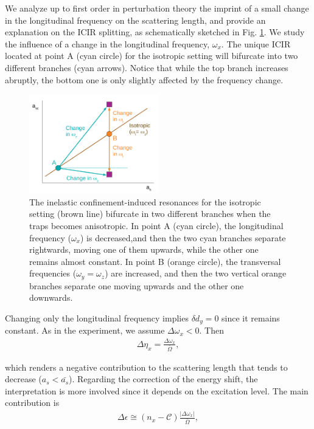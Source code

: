 \documentclass[aps,pre,twocolumn,superscriptaddress,showpacs]{revtex4-1}
\begin{document}
We analyze up to first order in perturbation theory the imprint of a small change in the longitudinal frequency on the scattering length, and provide an explanation on the ICIR splitting, as schematically sketched in Fig. \ref{fig:ICIR scheme}. We study the influence of a change in the longitudinal frequency, $\omega_x$. The unique ICIR located at point A (cyan circle) for the isotropic setting will bifurcate into two different branches (cyan arrows). Notice that while the top branch increases abruptly, the bottom one is only slightly affected by the frequency change.

\begin{figure}[htbp!]
\centering
\includegraphics[width=0.5\textwidth]{ICIR_scheme_Perturb}
\caption{The inelastic confinement-induced resonances for the isotropic setting (brown line) bifurcate in two different branches when the traps becomes anisotropic. In point A (cyan circle), the longitudinal frequency ($\omega_x$) is decreased,and then the two cyan branches separate rightwards, moving one of them upwards, while the other one remains almost constant. In point B (orange circle), the transversal frequencies ($\omega_y = \omega_z$) are increased, and then the two vertical orange branches separate one moving upwards and the other one downwards.}
\label{fig:ICIR scheme}
\end{figure}

Changing only the longitudinal frequency implies $\delta d_y = 0$ since it remains constant. As in the experiment, we assume $\Delta \omega_x < 0$. Then
\begin{eqnarray}
\Delta \eta_x = \frac{\Delta \omega_x}{\bar{\Omega}},
\label{eq:Delta eta_x perturbed}
\end{eqnarray}

which renders a negative contribution to the scattering length that tends to decrease ($a_s < \bar{a_s}$). Regarding the correction of the energy shift, the interpretation is more involved since it depends on the excitation level. The main contribution is
\begin{eqnarray}
\Delta \epsilon \cong (n_x - \mathcal{C}) \frac{|\Delta \omega_x|}{\bar{\Omega}},
\label{eq:Delta shift perturbed}
\end{eqnarray}
\end{document}
